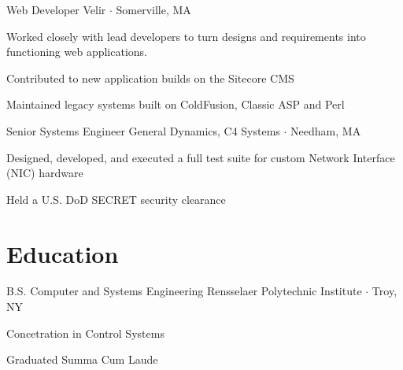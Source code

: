 \documentclass{article}
\begin{document}
{Web Developer}
{Velir $\cdot$ Somerville, MA}
{
  \begin{compactitem}
    \item Worked closely with lead developers to turn designs and requirements into functioning web applications. 
    \item Contributed to new application builds on the Sitecore CMS
    \item Maintained legacy systems built on ColdFusion, Classic ASP and Perl
  \end{compactitem}
}

{Senior Systems Engineer}
{General Dynamics, C4 Systems $\cdot$ Needham, MA}
{
  \begin{compactitem}
    \item Designed, developed, and executed a full test suite for custom Network Interface (NIC) hardware
    \item Held a U.S. DoD SECRET security clearance
  \end{compactitem}
}

\section{Education}

{B.S. Computer and Systems Engineering}
{Rensselaer Polytechnic Institute $\cdot$ Troy, NY}
{
  \begin{compactitem}
    \item Concetration in Control Systems
    \item Graduated Summa Cum Laude
  \end{compactitem}
}

\end{document}
